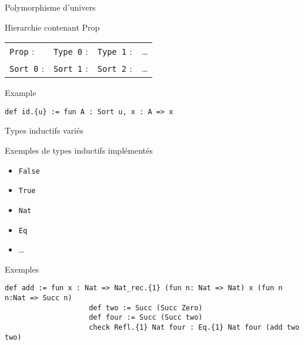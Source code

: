 \documentclass[12pt]{beamer}
\begin{document}
        \begin{frame}[fragile]{Polymorphisme d'univers}
            
            \begin{block}{Hierarchie contenant Prop}
               
                \begin{tabular}{llll}
                    \texttt{Prop} :& \texttt{Type 0} :& \texttt{Type 1} :& \dots \\
                    \texttt{Sort 0} :& \texttt{Sort 1} :& \texttt{Sort 2} :& \dots
                \end{tabular}
                
            \end{block}

            \begin{exampleblock}{Example}
                
                \begin{lstlisting}[language=mdln]
                    def id.{u} := fun A : Sort u, x : A => x
                \end{lstlisting}

            \end{exampleblock}

        \end{frame}

        \begin{frame}[fragile]{Types inductifs variés}
            
            \begin{exampleblock}{Exemples de types inductifs implémentés}
                
                \begin{itemize}
                    \item \lstinline{False} 
                    \item \lstinline{True}
                    \item \lstinline{Nat}
                    \item \lstinline{Eq}
                    \item \dots
                \end{itemize}

            \end{exampleblock} \pause

            \begin{exampleblock}{Exemples}
                
                \begin{lstlisting}[language=mdln]
                    def add := fun x : Nat => Nat_rec.{1} (fun n: Nat => Nat) x (fun n n:Nat => Succ n)
                    def two := Succ (Succ Zero)
                    def four := Succ (Succ two)
                    check Refl.{1} Nat four : Eq.{1} Nat four (add two two)
                \end{lstlisting}

            \end{exampleblock}

        \end{frame}
\end{document}
